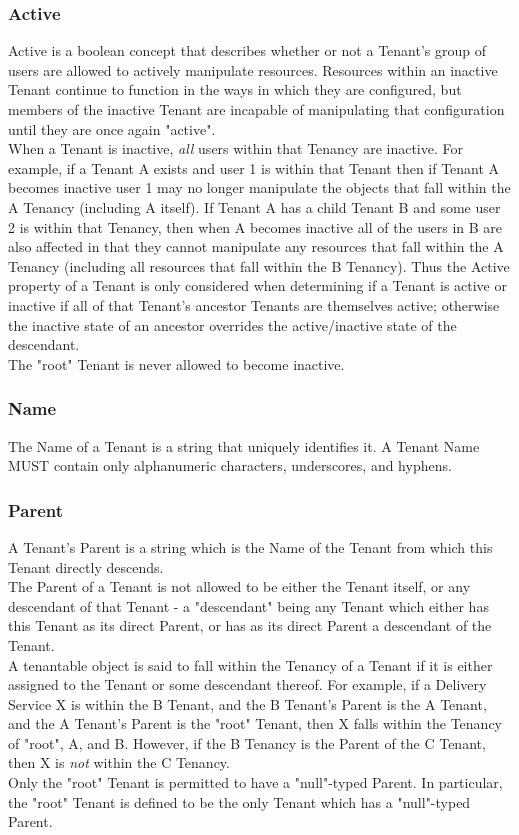 \subsubsection{Active}
Active is a boolean concept that describes whether or not a Tenant's group of
users are allowed to actively manipulate resources. Resources within an
inactive Tenant continue to function in the ways in which they are configured,
but members of the inactive Tenant are incapable of manipulating that
configuration until they are once again "active".\\
When a Tenant is inactive, \emph{all} users within that Tenancy are inactive.
For example, if a Tenant A exists and user 1 is within that Tenant then if
Tenant A becomes inactive user 1 may no longer manipulate the objects that
fall within the A Tenancy (including A itself). If Tenant A has a child Tenant
B and some user 2 is within that Tenancy, then when A becomes inactive all of
the users in B are also affected in that they cannot manipulate any resources
that fall within the A Tenancy (including all resources that fall within the
B Tenancy). Thus the Active property of a Tenant is only considered when
determining if a Tenant is active or inactive if all of that Tenant's
ancestor Tenants are themselves active; otherwise the inactive state of an
ancestor overrides the active/inactive state of the descendant.\\
The "root" Tenant is never allowed to become inactive.

\subsubsection{Name}
The Name of a Tenant is a string that uniquely identifies it. A Tenant Name
MUST contain only alphanumeric characters, underscores, and hyphens.

\subsubsection{Parent}
A Tenant's Parent is a string which is the Name of the Tenant from which this
Tenant directly descends.\\
The Parent of a Tenant is not allowed to be either the Tenant itself, or any
descendant of that Tenant - a "descendant" being any Tenant which either has
this Tenant as its direct Parent, or has as its direct Parent a descendant of
the Tenant.\\
A tenantable object is said to fall within the Tenancy of a Tenant if it is
either assigned to the Tenant or some descendant thereof. For example, if a
Delivery Service X is within the B Tenant, and the B Tenant's Parent is the A
Tenant, and the A Tenant's Parent is the "root" Tenant, then X falls within the
Tenancy of "root", A, and B. However, if the B Tenancy is the Parent of the C
Tenant, then X is \emph{not} within the C Tenancy.\\
Only the "root" Tenant is permitted to have a "null"-typed Parent. In
particular, the "root" Tenant is defined to be the only Tenant which has a
"null"-typed Parent.
